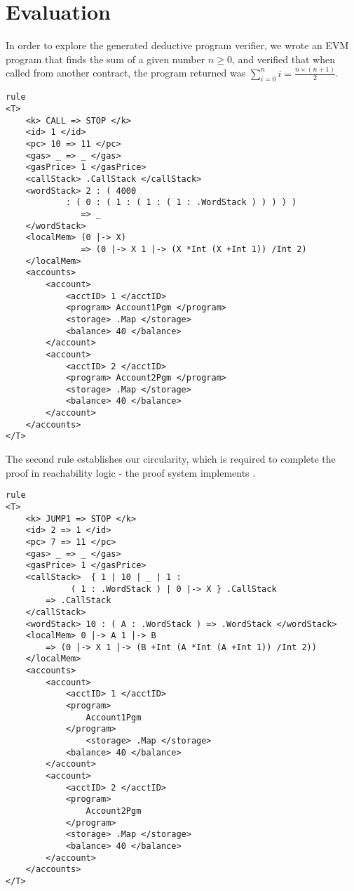 \section{Evaluation}
In order to explore the generated deductive program verifier, we wrote an EVM
program that finds the sum of a given number $n \geq 0 $, and verified that when called from another contract, the
program returned was $ \sum_{i = 0}^{n} i =  \frac{n \times  (n + 1 )}{2}$. 

\begin{verbatim}
rule
<T> 
    <k> CALL => STOP </k> 
    <id> 1 </id> 
    <pc> 10 => 11 </pc> 
    <gas> _ => _ </gas>
    <gasPrice> 1 </gasPrice> 
    <callStack> .CallStack </callStack> 
    <wordStack> 2 : ( 4000 
            : ( 0 : ( 1 : ( 1 : ( 1 : .WordStack ) ) ) ) ) 
               => _ 
    </wordStack> 
    <localMem> (0 |-> X) 
               => (0 |-> X 1 |-> (X *Int (X +Int 1)) /Int 2) 
    </localMem>
    <accounts>
        <account>     
            <acctID> 1 </acctID> 
            <program> Account1Pgm </program>
            <storage> .Map </storage>
            <balance> 40 </balance> 
        </account>
        <account>
            <acctID> 2 </acctID> 
            <program> Account2Pgm </program>
            <storage> .Map </storage>
            <balance> 40 </balance> 
        </account>
    </accounts>
</T>
\end{verbatim}






The second rule establishes our circularity, which is required to complete the proof in reachability logic - the proof system \K{} implements \cite{stefanescu-park-yuwen-li-rosu-2016-oopsla}. 
\begin{verbatim}
rule
<T> 
    <k> JUMP1 => STOP </k> 
    <id> 2 => 1 </id> 
    <pc> 7 => 11 </pc> 
    <gas> _ => _ </gas>
    <gasPrice> 1 </gasPrice> 
    <callStack>  { 1 | 10 | _ | 1 : 
             ( 1 : .WordStack ) | 0 |-> X } .CallStack
        => .CallStack  
    </callStack> 
    <wordStack> 10 : ( A : .WordStack ) => .WordStack </wordStack>
    <localMem> 0 |-> A 1 |-> B 
        => (0 |-> X 1 |-> (B +Int (A *Int (A +Int 1)) /Int 2)) 
    </localMem>
    <accounts>
        <account>     
            <acctID> 1 </acctID> 
            <program>
                Account1Pgm 
            </program>
                <storage> .Map </storage>
            <balance> 40 </balance> 
        </account>
        <account>
            <acctID> 2 </acctID> 
            <program> 
                Account2Pgm
            </program>  
            <storage> .Map </storage>
            <balance> 40 </balance> 
        </account>
    </accounts>
</T>

\end{verbatim}

